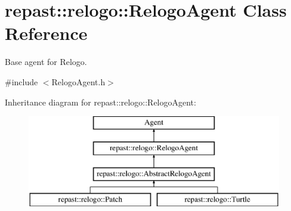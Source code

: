 \hypertarget{classrepast_1_1relogo_1_1_relogo_agent}{\section{repast\-:\-:relogo\-:\-:Relogo\-Agent Class Reference}
\label{classrepast_1_1relogo_1_1_relogo_agent}
}


Base agent for Relogo.  




{\ttfamily \#include $<$Relogo\-Agent.\-h$>$}

Inheritance diagram for repast\-:\-:relogo\-:\-:Relogo\-Agent\-:\begin{figure}[H]
\begin{center}
\leavevmode
\includegraphics[height=4.000000cm]{classrepast_1_1relogo_1_1_relogo_agent}
\end{center}
\end{figure}

